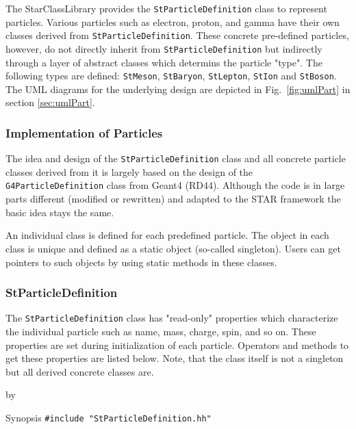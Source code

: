 \documentclass[twoside]{article}
\newcommand{\comp}[1]{\texttt{#1}}%
\newcommand{\entrylabel}[1]{\mbox{\textbf{{#1}}}\hfil}%
\newenvironment{entry}
{\begin{list}{}%
    {\renewcommand{\makelabel}{\entrylabel}%
     \setlength{\labelwidth}{90pt}%
     \setlength{\leftmargin}{\labelwidth}
     \advance\leftmargin by \labelsep%
      }%
    }%
  {\end{list}}
\newcommand{\Entrylabel}[1]%
{\raisebox{0pt}[1ex][0pt]{\makebox[\labelwidth][l]%
    {\parbox[t]{\labelwidth}{\hspace{0pt}\textbf{{#1}}}}}}
\newenvironment{Entry}%
{\renewcommand{\entrylabel}{\Entrylabel}\begin{entry}}%
  {\end{entry}}
\begin{document}
\begin{description}
The StarClassLibrary provides the \comp{StParticleDefinition} class to
represent particles. Various particles such as electron, proton, and
gamma have their own classes derived from \comp{StParticleDefinition}. 
These concrete pre-defined particles, however, do not directly inherit
from \comp{StParticleDefinition} but indirectly through a layer of abstract
classes which determins the particle "type".  The following types are defined:
\comp{StMeson}, \comp{StBaryon}, \comp{StLepton}, \comp{StIon} and \comp{StBoson}.
The UML diagrams for the underlying design are depicted in Fig.~\ref{fig:umlPart}
in section \ref{sec:umlPart}.

\subsubsection{Implementation of Particles}

The idea and design of the \comp{StParticleDefinition} class and all
concrete particle classes derived from it is largely based on the
design of the \comp{G4ParticleDefinition} class from Geant4
(RD44).  Although the code is in large parts different
(modified or rewritten) and adapted to the STAR framework the basic
idea stays the same.

An individual class is defined for each predefined particle. The
object in each class is unique and defined as a static object (so-called
singleton).  Users can get pointers to such objects by using static
methods in these classes.

\subsubsection{StParticleDefinition}

The \comp{StParticleDefinition} class has "read-only" properties which
characterize the individual particle such as name, mass, charge, spin, and
so on. These properties are set during initialization of each particle.
Operators and methods to get these properties are listed below. Note,
that the class itself is not a singleton but all derived concrete
classes are.

\begin{Entry}
\item[Synopsis]
    \verb+#include "StParticleDefinition.hh"+\\    
    

\end{Entry}
\end{description}
\end{document}
